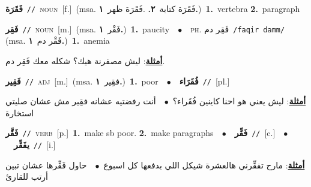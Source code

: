 \documentclass[10pt,a4paper,twoside]{article} %
\begin{document}
\begin{multicols}{2}
{\setlength\topsep{0pt}\textbf{\foreignlanguage{arabic}{فَقَرَة}}\ {\color{gray}\texttt{//}\color{black}}\ \textsc{noun}\ [f.]\ \color{gray}(msa. \foreignlanguage{arabic}{فَقَرَة كتابة}~\foreignlanguage{arabic}{\textbf{٢.}}  .\foreignlanguage{arabic}{فَقَرَة ظهر}~\foreignlanguage{arabic}{\textbf{١.}})\color{black}\ \textbf{1.}~vertebra  \textbf{2.}~paragraph\ } \vspace{2mm}

{\setlength\topsep{0pt}\textbf{\foreignlanguage{arabic}{فَقِر}}\ {\color{gray}\texttt{//}\color{black}}\ \textsc{noun}\ [m.]\ \color{gray}(msa. \foreignlanguage{arabic}{فَقْر}~\foreignlanguage{arabic}{\textbf{١.}})\color{black}\ \textbf{1.}~paucity\ \ $\bullet$\ \ \textsc{ph.} \color{gray} \foreignlanguage{arabic}{فَقِر دم}\color{black}\ {\color{gray}\texttt{/{\sffamily faqir damm}/}\color{black}}\ \color{gray} (msa. \foreignlanguage{arabic}{فَقْر دم}~\foreignlanguage{arabic}{\textbf{١.}})\color{black}\ \textbf{1.}~anemia\  \begin{flushright}\color{gray}\foreignlanguage{arabic}{\textbf{\underline{\foreignlanguage{arabic}{أمثلة}}}: ليش مصفرنة هيك؟ شكله معك فَقِر دم.}\end{flushright}\color{black}} \vspace{2mm}

{\setlength\topsep{0pt}\textbf{\foreignlanguage{arabic}{فَقِير}}\ {\color{gray}\texttt{//}\color{black}}\ \textsc{adj}\ [m.]\ \color{gray}(msa. \foreignlanguage{arabic}{فقِير}~\foreignlanguage{arabic}{\textbf{١.}})\color{black}\ \textbf{1.}~poor\ \ $\bullet$\ \ \setlength\topsep{0pt}\textbf{\foreignlanguage{arabic}{فُقَرَاء}}\ {\color{gray}\texttt{//}\color{black}}\ [pl.]\  \begin{flushright}\color{gray}\foreignlanguage{arabic}{\textbf{\underline{\foreignlanguage{arabic}{أمثلة}}}: ليش يعني هو احنا كاينين فُقَراء؟\ $\bullet$\ \  أنت رفضتيه عشانه فقِير مش عشان صليتي استخارة}\end{flushright}\color{black}} \vspace{2mm}

{\setlength\topsep{0pt}\textbf{\foreignlanguage{arabic}{فَقَّر}}\ {\color{gray}\texttt{//}\color{black}}\ \textsc{verb}\ [p.]\ \textbf{1.}~make sb poor.  \textbf{2.}~make paragraphs\ \ $\bullet$\ \ \setlength\topsep{0pt}\textbf{\foreignlanguage{arabic}{فَقِّر}}\ {\color{gray}\texttt{//}\color{black}}\ [c.]\ \ $\bullet$\ \ \setlength\topsep{0pt}\textbf{\foreignlanguage{arabic}{يفَقِّر}}\ {\color{gray}\texttt{//}\color{black}}\ [i.]\  \begin{flushright}\color{gray}\foreignlanguage{arabic}{\textbf{\underline{\foreignlanguage{arabic}{أمثلة}}}: مارح تفقِّرني هالعشرة شيكل اللي بدفعها كل اسبوع\ $\bullet$\ \  حاول فَقِّرها عشان تبين أرتب للقارئ}\end{flushright}\color{black}} \vspace{2mm}


\end{multicols}
\end{document}
